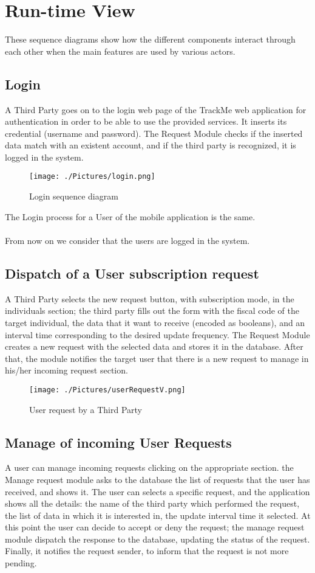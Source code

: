 \section{Run-time View}
These sequence diagrams show how the different components interact through each other when the main features are used by various actors.
\subsection{Login}
A Third Party goes on to the login web page of the TrackMe web application for authentication in order to be able to use the provided services. It inserts its credential (username and password). The Request Module checks if the inserted data match with an existent account, and if the third party is recognized, it is logged in the system.

\begin{figure}[H]
    \centering
    \texttt{[image: ./Pictures/login.png]}
    \caption{Login sequence diagram}
\end{figure}

The Login process for a User of the mobile application is the same.\\ \\
From now on we consider that the users are logged in the system.

\subsection{Dispatch of a User subscription request}
A Third Party selects the new request button, with subscription mode, in the individuals section; the third party fills out the form with the fiscal code of the target individual, the data that it want to receive (encoded as booleans), and an interval time corresponding to the desired update frequency. The Request Module creates a new request with the selected data and stores it in the database. After that, the module notifies the target user that there is a new request to manage in his/her incoming request section.

\begin{figure}[H]
    \centering
    \texttt{[image: ./Pictures/userRequestV.png]}
    \caption{User request by a Third Party}
\end{figure}

\subsection{Manage of incoming User Requests}
A user can manage incoming requests clicking on the appropriate section. the Manage request module asks to the database the list of requests that the user has received, and shows it. The user can selects a specific request, and the application shows all the details:
the name of the third party which performed the request, the list of data in which it is interested in, the update interval time it selected. At this point the user can decide to accept or deny the request; the manage request module dispatch the response to the database, updating the status of the request. Finally, it notifies the request sender, to inform that the request is not more pending. 

